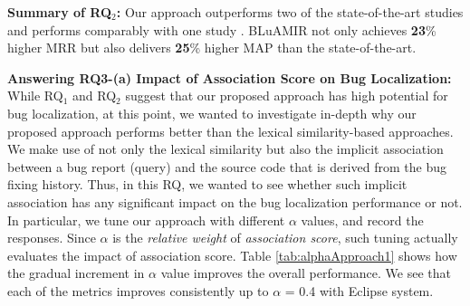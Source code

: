 \documentclass[sigconf,review,anonymous]{acmart}
\begin{document}
\begin{framed}
	\noindent
	\textbf{Summary of RQ$_2$:} Our approach outperforms two of the state-of-the-art studies \cite{Nguyen,Jian} and performs comparably with one study \cite{Saha}. BLuAMIR not only achieves \textbf{23}\% higher MRR but also delivers \textbf{25}\% higher MAP than the state-of-the-art. 
\end{framed}

\textbf{Answering RQ3-(a) Impact of Association Score on Bug Localization:} 
While RQ$_1$ and RQ$_2$ suggest that our proposed approach has high potential for bug localization, at this point, we wanted to investigate in-depth why our proposed approach performs better than the lexical similarity-based approaches. We make use of 
not only the lexical similarity but also the implicit association between a bug report (query) and the source code that is derived from the bug fixing history. Thus, in this RQ, we wanted to see whether such implicit association has any significant impact on the bug localization performance or not. 
In particular, we tune our approach with different $\alpha$ values, and record the responses. Since $\alpha$ is the \emph{relative weight} of \emph{association score}, such tuning actually evaluates the impact of association score.  
Table \ref{tab:alphaApproach1} shows how the gradual increment in $\alpha$ value improves the overall performance. We see that each of the metrics improves consistently up to $\alpha$ = 0.4 with Eclipse system. 
\end{document}
